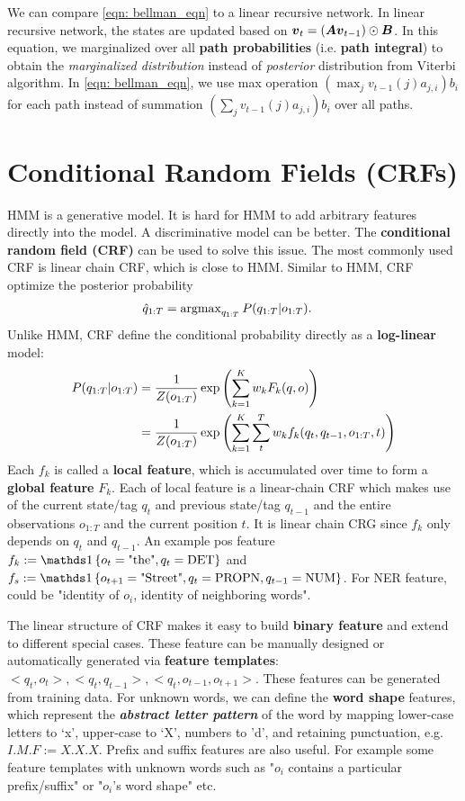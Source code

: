 \documentclass[11pt]{article}
\begin{document}
We can compare \eqref{eqn: bellman_eqn} to a linear recursive network. In linear recursive network, the states are updated based on $\boldsymbol{v}_{t} = (\boldsymbol{A}\boldsymbol{v}_{t-1})\odot \boldsymbol{B}$. In this equation, we marginalized over all \textbf{path probabilities} (i.e. \textbf{path integral}) to obtain the \emph{marginalized distribution} instead of \emph{posterior} distribution from Viterbi algorithm. In \eqref{eqn: bellman_eqn}, we use max operation $(\max_{j}v_{t-1}(j)a_{j,i})b_{i}$ for each path instead of summation $(\sum_{j}v_{t-1}(j)a_{j,i})b_{i}$ over all paths.


\section{Conditional Random Fields (CRFs)}
HMM is a generative model. It is hard for HMM to add arbitrary features directly into the model. A discriminative model can be better. The \textbf{conditional random field (CRF)} can be used to solve this issue. The most commonly used CRF is linear chain CRF, which is close to HMM. Similar to HMM, CRF optimize the posterior probability
\begin{align*}
\hat{q}_{1:T} &= \operatorname{argmax}_{q_{1:T}} P(q_{1:T} | o_{1:T}).
\end{align*} Unlike HMM, CRF define the conditional probability directly as a \textbf{log-linear} model: 
\begin{align*}
P(q_{1:T} | o_{1:T}) &= \frac{1}{Z(o_{1:T})} \exp\left(\sum_{k=1}^{K}w_{k}F_{k}(q, o)\right)\\
&= \frac{1}{Z(o_{1:T})} \exp\left(\sum_{k=1}^{K}\sum_{t}^{T}w_{k}f_{k}(q_{t}, q_{t-1}, o_{1:T}, t)\right)\\
\end{align*} Each $f_{k}$ is called a \textbf{local feature}, which is accumulated over time to form a \textbf{global feature} $F_{k}$. Each of local feature is a linear-chain CRF which makes use of the current state/tag $q_{t}$ and previous state/tag $q_{t-1}$ and the entire observations $o_{1:T}$ and the current position $t$. It is linear chain CRG since $f_{k}$ only depends on $q_{t}$ and $q_{t-1}$. An example pos feature $f_{k}:= \ind{o_{t} = \text{"the"}, q_{t} = \text{DET}}$ and 
$f_{s} := \ind{o_{t+1} = \text{"Street"}, q_{t}=\text{PROPN},  q_{t-1}=\text{NUM}}$. For NER feature, could be "identity of $o_{i}$, identity of neighboring words". 

The linear structure of CRF makes it easy to build \textbf{binary feature} and extend to different special cases. These feature can be manually designed or automatically generated via \textbf{feature templates}: $<q_{t}, o_{t}>, <q_{t}, q_{t-1}>, <q_{t}, o_{t-1}, o_{t+1}>$. These features can be generated from training data. For unknown words, we can define the \textbf{word shape} features, which represent the \emph{\textbf{abstract letter pattern}} of the word by mapping lower-case letters to ‘x’, upper-case to ‘X’, numbers to ’d’, and retaining punctuation, e.g. $I.M.F:= X.X.X$. Prefix and suffix features are also useful. For example some feature templates with unknown words such as "$o_i$ contains a particular prefix/suffix" or "$o_{i}$'s word shape" etc.
\end{document}
